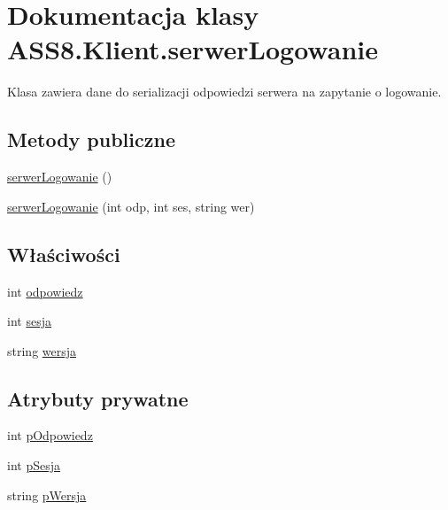 \hypertarget{a00025}{
\section{Dokumentacja klasy ASS8.Klient.serwerLogowanie}
\label{d3/dfe/a00025}
}
Klasa zawiera dane do serializacji odpowiedzi serwera na zapytanie o logowanie.  


\subsection*{Metody publiczne}
\begin{CompactItemize}
\item 
\hyperlink{a00025_87dd9f8f0a4c13f2618f3665e0939990}{serwerLogowanie} ()
\item 
\hyperlink{a00025_2f95f4b70f385acadc411c05487d9a66}{serwerLogowanie} (int odp, int ses, string wer)
\end{CompactItemize}
\subsection*{Właściwości}
\begin{CompactItemize}
\item 
int \hyperlink{a00025_2db358a96d3e800ffda1100aefd4cb2f}{odpowiedz}
\item 
int \hyperlink{a00025_2102ee09e6fb509d2409223a6ce6e019}{sesja}
\item 
string \hyperlink{a00025_4790b4d929cd024c7ab8f983f1e507cd}{wersja}
\end{CompactItemize}
\subsection*{Atrybuty prywatne}
\begin{CompactItemize}
\item 
int \hyperlink{a00025_45258daf05e76c2327ba5d5040095c2c}{pOdpowiedz}
\item 
int \hyperlink{a00025_48bbf2d8e5271942632a35e9cd565c99}{pSesja}
\item 
string \hyperlink{a00025_413769e602351ad26002d9ce6158629a}{pWersja}
\end{CompactItemize}


